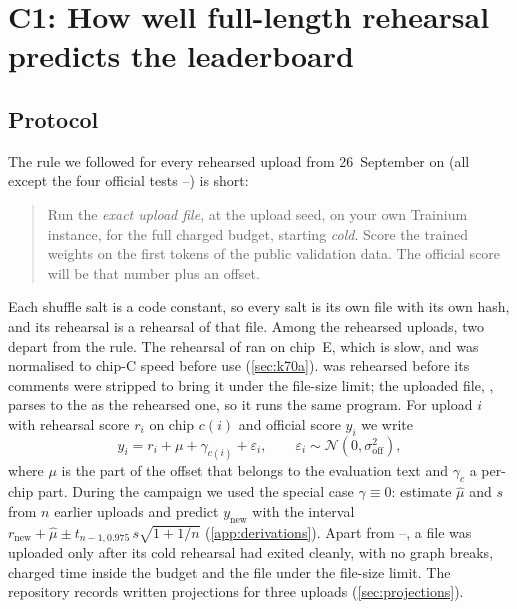 \section{C1: How well full-length rehearsal predicts the leaderboard}
\label{sec:oracle}

\subsection{Protocol}

The rule we followed for every rehearsed upload from 26~September on (all except the four official tests
--) is short:
\begin{quote}
  Run the \emph{exact upload file}, at the upload seed, on your own Trainium instance, for the full charged budget,
  starting \emph{cold}. Score the trained weights on the first  tokens of the public validation
  data. The official score will be that number plus an offset.
\end{quote}
Each shuffle salt is a code constant, so every salt is its own file with its own hash, and its rehearsal is a
rehearsal of that file. Among the rehearsed uploads, two depart from the rule. The rehearsal of  ran on
chip~E, which is slow, and was normalised to chip-C speed before use (\cref{sec:k70a}).  was rehearsed
before its comments were stripped to bring it under the file-size limit; the uploaded file, , parses to the
\docnum{} as the rehearsed one, so it runs the same program. For upload $i$ with rehearsal
score $r_i$ on chip $c(i)$ and official score $y_i$ we write
\begin{equation}
  \label{eq:offset}
  y_i = r_i + \mu + \gamma_{c(i)} + \varepsilon_i, \qquad \varepsilon_i \sim \mathcal{N}(0, \sigma_{\text{off}}^2),
\end{equation}
where $\mu$ is the part of the offset that belongs to the evaluation text and $\gamma_c$ a per-chip part. During
the campaign we used the special case $\gamma\equiv0$: estimate $\hat\mu$ and $s$ from $n$ earlier uploads and
predict $y_{\text{new}}$ with the interval $r_{\text{new}} + \hat\mu \pm t_{n-1,0.975}\, s\sqrt{1 + 1/n}$
(\cref{app:derivations}). Apart from --, a file was uploaded only after its cold rehearsal
had exited cleanly, with no graph breaks, charged time inside the budget and the file under the file-size limit. The
repository records written projections for three uploads (\cref{sec:projections}).


